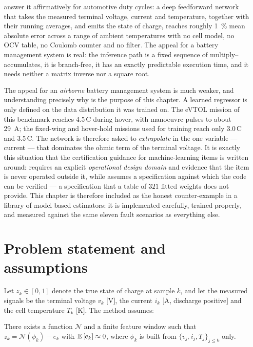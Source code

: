 \citet{chemali2018dnn} answer it affirmatively for automotive duty cycles: a deep feedforward
network that takes the measured terminal voltage, current and temperature, together with their
running averages, and emits the state of charge, reaches roughly \SI{1}{\percent} mean absolute
error across a range of ambient temperatures with no cell model, no OCV table, no Coulomb
counter and no filter.  The appeal for a battery management system is real: the inference path is
a fixed sequence of multiply--accumulates, it is branch-free, it has an exactly predictable
execution time, and it needs neither a matrix inverse nor a square root.

The appeal for an \emph{airborne} battery management system is much weaker, and understanding
precisely why is the purpose of this chapter.  A learned regressor is only defined on the data
distribution it was trained on.  The eVTOL mission of this benchmark reaches
4.5\,C during hover, with manoeuvre pulses to about \SI{29}{\ampere}; the fixed-wing and
hover-hold missions used for training reach only 3.0\,C and 3.5\,C.  The
network is therefore asked to \emph{extrapolate} in the one variable --- current --- that
dominates the ohmic term of the terminal voltage.  It is exactly this situation that the
certification guidance for machine-learning items is written around: \citet{easa2023ai} requires
an explicit \emph{operational design domain} and evidence that the item is never operated outside
it, while \citet{rtca2011do178c} assumes a specification against which the code can be verified
--- a specification that a table of $\num{321}$ fitted weights does not provide.  This chapter is
therefore included as the honest counter-example in a library of model-based estimators: it is
implemented carefully, trained properly, and measured against the same eleven fault scenarios as
everything else.

\section{Problem statement and assumptions}
Let $z_k \in [0,1]$ denote the true state of charge at sample $k$, and let the measured signals be
the terminal voltage $v_k$ [\si{\volt}], the current $i_k$ [\si{\ampere}, discharge positive] and
the cell temperature $T_k$ [\si{\kelvin}].  The method assumes:

\begin{assumption}\label{as:nnd-static}
There exists a function $\mathcal{N}$ and a finite feature window such that
$z_k = \mathcal{N}(\phi_k) + e_k$ with $\mathbb{E}\left[e_k\right]\approx 0$, where $\phi_k$ is built from
$\{v_j, i_j, T_j\}_{j\le k}$ only.
\end{assumption}

